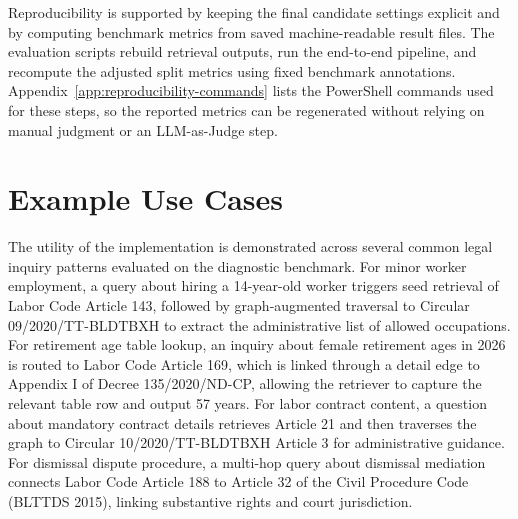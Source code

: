 Reproducibility is supported by keeping the final candidate settings explicit and by computing benchmark metrics from saved machine-readable result files. The evaluation scripts rebuild retrieval outputs, run the end-to-end pipeline, and recompute the adjusted split metrics using fixed benchmark annotations. Appendix~\ref{app:reproducibility-commands} lists the PowerShell commands used for these steps, so the reported metrics can be regenerated without relying on manual judgment or an LLM-as-Judge step.

\section{Example Use Cases}
The utility of the implementation is demonstrated across several common legal inquiry patterns evaluated on the diagnostic benchmark. For minor worker employment, a query about hiring a 14-year-old worker triggers seed retrieval of Labor Code Article 143, followed by graph-augmented traversal to Circular 09/2020/TT-BLDTBXH to extract the administrative list of allowed occupations. For retirement age table lookup, an inquiry about female retirement ages in 2026 is routed to Labor Code Article 169, which is linked through a detail edge to Appendix I of Decree 135/2020/ND-CP, allowing the retriever to capture the relevant table row and output 57 years. For labor contract content, a question about mandatory contract details retrieves Article 21 and then traverses the graph to Circular 10/2020/TT-BLDTBXH Article 3 for administrative guidance. For dismissal dispute procedure, a multi-hop query about dismissal mediation connects Labor Code Article 188 to Article 32 of the Civil Procedure Code (BLTTDS 2015), linking substantive rights and court jurisdiction.
